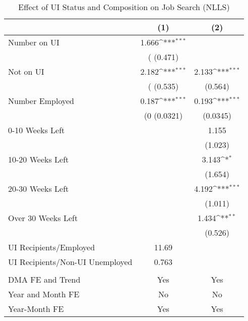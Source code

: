 \begin{table}[htbp]\centering
\def\sym#1{\ifmmode^{#1}\else\(^{#1}\)\fi}
\caption{Effect of UI Status and Composition on Job Search (NLLS)}
\begin{tabular}{l*{2}{c}}
\hline\hline
                    &\multicolumn{1}{c}{(1)}         &\multicolumn{1}{c}{(2)}         \\
\hline
Number on UI        &           1.666\sym{***}&                     \\
                    &     (   (0.471)         &                     \\
Not on UI           &           2.182\sym{***}&       2.133\sym{***}\\
                    &     (   (0.535)         &     (0.564)         \\
Number Employed     &           0.187\sym{***}&       0.193\sym{***}\\
                    &    (0  (0.0321)         &    (0.0345)         \\
0-10 Weeks Left     &                         &       1.155         \\
                    &                         &     (1.023)         \\
10-20 Weeks Left    &                         &       3.143\sym{*}  \\
                    &                         &     (1.654)         \\
20-30 Weeks Left    &                         &       4.192\sym{***}\\
                    &                         &     (1.011)         \\
Over 30 Weeks Left  &                         &       1.434\sym{**} \\
                    &                         &     (0.526)         \\
\hline
UI Recipients/Employed &       11.69         &                     \\
UI Recipients/Non-UI Unemployed &       0.763         &                     \\
\hline \vspace{-2mm}&                  &                     \\
DMA FE and Trend    &      Yes         &         Yes         \\
Year and Month FE   &       No         &          No         \\
Year-Month FE       &      Yes         &         Yes         \\

\end{tabular}
\end{table}
